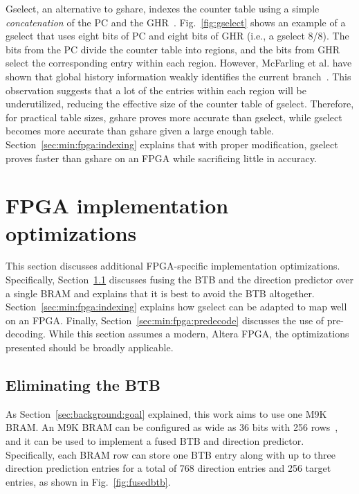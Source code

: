 Gselect, an alternative to gshare, indexes the counter table using a simple \textit{concatenation} of the PC and the GHR~\cite{McFarling}. Fig.~\ref{fig:gselect} shows an example of a gselect that uses eight bits of PC and eight bits of GHR (i.e., a gselect 8/8). The bits from the PC divide the counter table into regions, and the bits from GHR select the corresponding entry within each region. However, McFarling et al. have shown that global history information weakly identifies the current branch~\cite{McFarling}. This observation suggests that a lot of the entries within each region will be underutilized, reducing the effective size of the counter table of gselect. Therefore, for practical table sizes, gshare proves more accurate than gselect, while gselect becomes more accurate than gshare given a large enough table. Section~\ref{sec:min:fpga:indexing} explains that with proper modification, gselect proves faster than gshare on an FPGA while sacrificing little in accuracy.

\section{FPGA implementation optimizations}
\label{sec:min:fpga}
This section discusses additional FPGA-specific implementation optimizations. Specifically, Section~\ref{sec:min:fpga:nobtb} discusses fusing the BTB and the direction predictor over a single BRAM and explains that it is best to avoid the BTB altogether. Section~\ref{sec:min:fpga:indexing} explains how gselect can be adapted to map well on an FPGA. Finally, Section~\ref{sec:min:fpga:predecode} discusses the use of pre-decoding. While this section assumes a modern, Altera FPGA, the optimizations presented should be broadly applicable.

\subsection{Eliminating the BTB}
\label{sec:min:fpga:nobtb}
As Section~\ref{sec:background:goal} explained, this work aims to use one M9K BRAM. An M9K BRAM can be configured as wide as 36 bits with 256 rows~\cite{StratixIVM9K}, and it can be used to implement a fused BTB and direction predictor. Specifically, each BRAM row can store one BTB entry along with up to three direction prediction entries for a total of 768 direction entries and 256 target entries, as shown in Fig.~\ref{fig:fusedbtb}.

